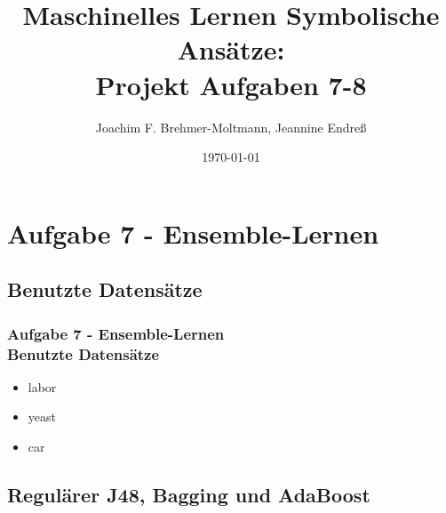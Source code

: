 \documentclass[accentcolor=tud10b,colorbacktitle,inverttitle,landscape,german,presentation,t]{tudbeamer}
\begin{document}
\title[MLDM: Projekt Aufg 7-8]{Maschinelles Lernen Symbolische Ansätze:\\ Projekt Aufgaben 7-8}
\subtitle{}

\author[brehmer\_endreß]{Joachim F. Brehmer-Moltmann, Jeannine Endreß}

\date{\today}

\begin{titleframe}
\tableofcontents
\end{titleframe}

    \section{Aufgabe 7 - Ensemble-Lernen}
    
    \subsection{Benutzte Datensätze}
    
    \begin{frame}[t]
    \frametitle{Aufgabe 7 - Ensemble-Lernen\\ Benutzte Datensätze}
        \begin{itemize}
            \item labor
            \item yeast
            \item car
        \end{itemize}
    \end{frame}
    
    \subsection{Regulärer J48, Bagging und AdaBoost}
    
\end{document}
